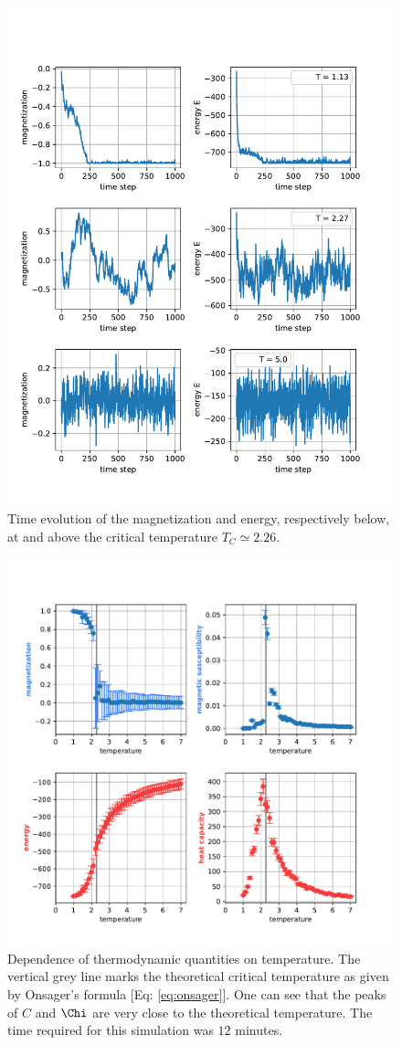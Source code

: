 \begin{figure}[H]
    \centering
    \includegraphics[width=0.6\linewidth]{latex_source/images/ising/2d_relaxation.pdf}
    \caption{{\small Time evolution of the magnetization and energy, respectively below, at and above the critical temperature $T_C \simeq 2.26$. }}
    \label{fig:2d_relaxation}
\end{figure}

\begin{figure}[H]
    \centering
    \includegraphics[width=\linewidth]{latex_source/images/ising/2d_scaling.pdf}
    \caption{Dependence of thermodynamic quantities on temperature. The vertical grey line marks the theoretical critical temperature as given by Onsager's formula [Eq: \ref{eq:onsager}]. One can see that the peaks of $C$ and $\Chi$ are very close to the theoretical temperature. The time required for this simulation was $12$ minutes.}
    \label{fig:2d_scaling}
\end{figure}